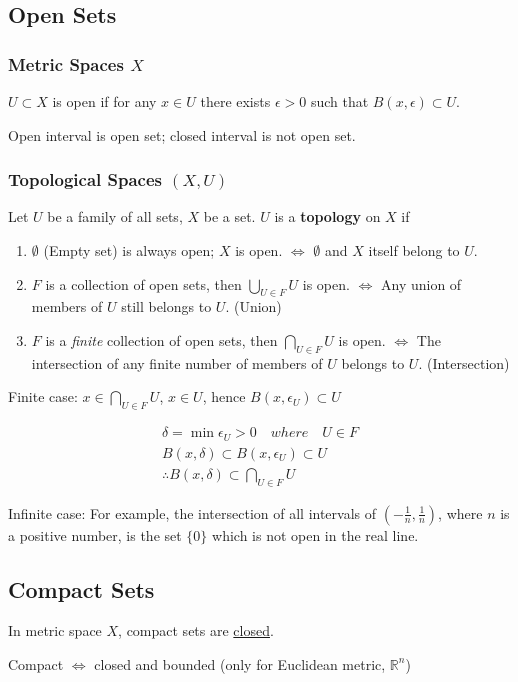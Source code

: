 \documentclass{article}
\begin{document}
    \subsection{Open Sets}

        \subsubsection{Metric Spaces $X$}

        $U \subset X$ is open if for any $x \in U$ there exists $\epsilon > 0$ such that $B(x, \epsilon) \subset U$.

        Open interval is open set; closed interval is not open set.

        \subsubsection{Topological Spaces $(X, U)$}

        Let $U$ be a family of all sets, $X$ be a set. $U$ is a \textbf{topology} on $X$ if

        \begin{enumerate}
            \item $\emptyset$ (Empty set) is always open; $X$ is open. $\Leftrightarrow$ $\emptyset$ and $X$ itself belong to $U$.
            \item $F$ is a collection of open sets, then $\bigcup_{U \in F} U$ is open. $\Leftrightarrow$ Any union of members of $U$ still belongs to $U$. (Union)
            \item $F$ is a \textit{finite} collection of open sets, then $\bigcap_{U \in F} U$ is open. $\Leftrightarrow$ The intersection of any finite number of members of $U$ belongs to $U$. (Intersection)
        \end{enumerate}

        Finite case: $x \in \bigcap_{U \in F} U$, $x \in U$, hence $B(x, \epsilon_{U}) \subset U$

        \begin{gather*}
            \delta = \min \epsilon_{U} > 0 \quad where \quad U \in F \\
            B(x, \delta) \subset B(x, \epsilon_{U}) \subset U \\
            \therefore B(x, \delta) \subset \bigcap_{U \in F} U
        \end{gather*}

        Infinite case: For example, the intersection of all intervals of $( -\frac{1}{n}, \frac{1}{n})$, where $n$ is a positive number, is the set $\{ 0 \}$ which is not open in the real line.

    \subsection{Compact Sets}

        In metric space $X$, compact sets are \underline{closed}.

        Compact $\Leftrightarrow$ closed and bounded (only for Euclidean metric, $\mathbb{R}^{n}$)
\end{document}
